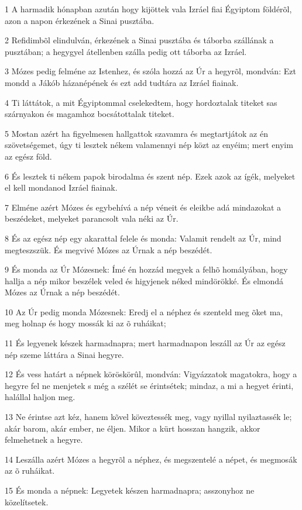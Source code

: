 \par 1 A harmadik hónapban azután hogy kijöttek vala Izráel fiai Égyiptom földérõl, azon a napon érkezének a Sinai pusztába.
\par 2 Refidimbõl elindulván, érkezének a Sinai pusztába és táborba szállának a pusztában; a hegygyel átellenben szálla pedig ott táborba az Izráel.
\par 3 Mózes pedig felméne az Istenhez, és szóla hozzá az Úr a hegyrõl, mondván: Ezt mondd a Jákób házanépének és ezt add tudtára az Izráel fiainak.
\par 4 Ti láttátok, a mit Égyiptommal cselekedtem, hogy hordoztalak titeket sas szárnyakon és magamhoz bocsátottalak titeket.
\par 5 Mostan azért ha figyelmesen hallgattok szavamra és megtartjátok az én szövetségemet, úgy ti lesztek nékem valamennyi nép közt az enyéim; mert enyim az egész föld.
\par 6 És lesztek ti nékem papok birodalma és szent nép. Ezek azok az ígék, melyeket el kell mondanod Izráel fiainak.
\par 7 Elméne azért Mózes és egybehívá a nép véneit és eleikbe adá mindazokat a beszédeket, melyeket parancsolt vala néki az Úr.
\par 8 És az egész nép egy akarattal felele és monda: Valamit rendelt az Úr, mind megteszszük. És megvivé Mózes az Úrnak a nép beszédét.
\par 9 És monda az Úr Mózesnek: Ímé én hozzád megyek a felhõ homályában, hogy hallja a nép mikor beszélek veled és higyjenek néked mindörökké. És elmondá Mózes az Úrnak a nép beszédét.
\par 10 Az Úr pedig monda Mózesnek: Eredj el a néphez és szenteld meg õket ma, meg holnap és hogy mossák ki az õ ruháikat;
\par 11 És legyenek készek harmadnapra; mert harmadnapon leszáll az Úr az egész nép szeme láttára a Sinai hegyre.
\par 12 És vess határt a népnek köröskörûl, mondván: Vigyázzatok magatokra, hogy a hegyre fel ne menjetek s még a szélét se érintsétek; mindaz, a mi a hegyet érinti, halállal haljon meg.
\par 13 Ne érintse azt kéz, hanem kõvel köveztessék meg, vagy nyillal nyilaztassék le; akár barom, akár ember, ne éljen. Mikor a kürt hosszan hangzik, akkor felmehetnek a hegyre.
\par 14 Leszálla azért Mózes a hegyrõl a néphez, és megszentelé a népet, és megmosák az õ ruháikat.
\par 15 És monda a népnek: Legyetek készen harmadnapra; asszonyhoz ne közelítsetek.
